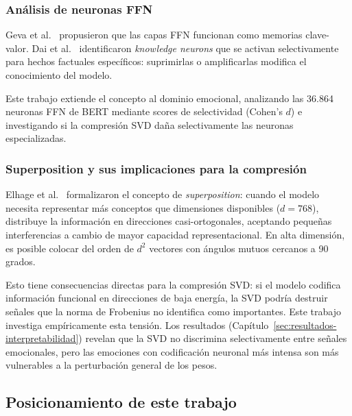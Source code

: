 \subsubsection{Análisis de neuronas FFN}
\label{sec:sota-neuronas}

Geva et al.\ \cite{geva2021transformer} propusieron que las capas FFN funcionan
como memorias clave-valor. Dai et al.\ \cite{dai2022knowledge} identificaron
\textit{knowledge neurons} que se activan selectivamente para hechos factuales
específicos: suprimirlas o amplificarlas modifica el conocimiento del modelo.

Este trabajo extiende el concepto al dominio emocional, analizando las 36.864
neuronas FFN de BERT mediante scores de selectividad (Cohen's $d$) e investigando
si la compresión SVD daña selectivamente las neuronas especializadas.

\subsubsection{Superposition y sus implicaciones para la compresión}
\label{sec:sota-superposition}

Elhage et al.\ \cite{elhage2022toy} formalizaron el concepto de \emph{superposition}:
cuando el modelo necesita representar más conceptos que dimensiones disponibles
($d = 768$), distribuye la información en direcciones casi-ortogonales, aceptando
pequeñas interferencias a cambio de mayor capacidad representacional. En alta
dimensión, es posible colocar del orden de $d^2$ vectores con ángulos mutuos
cercanos a 90 grados.

Esto tiene consecuencias directas para la compresión SVD: si el modelo codifica
información funcional en direcciones de baja energía, la SVD podría destruir señales
que la norma de Frobenius no identifica como importantes. Este trabajo investiga
empíricamente esta tensión. Los resultados
(Capítulo~\ref{sec:resultados-interpretabilidad}) revelan que la SVD no discrimina
selectivamente entre señales emocionales, pero las emociones con codificación
neuronal más intensa son más vulnerables a la perturbación general de los pesos.

\subsection{Posicionamiento de este trabajo}
\label{sec:sota-posicionamiento}

